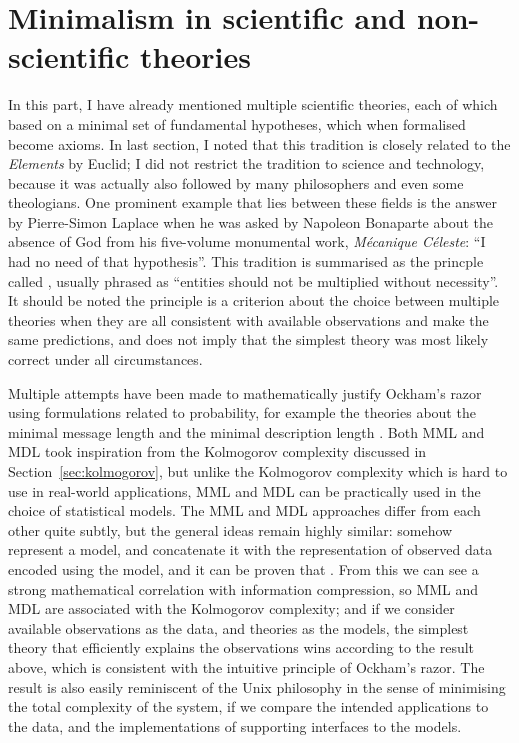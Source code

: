 \section{Minimalism in scientific and non-scientific theories}\label{sec:ockham}

In this part, I have already mentioned multiple scientific theories,
each of which based on a minimal set of fundamental hypotheses, which
when formalised become axioms.  In last section, I noted that this tradition
is closely related to the \emph{Elements} by Euclid; I did not restrict the
tradition to science and technology, because it was actually also followed
by many philosophers and even some theologians.  One prominent example that
lies between these fields is the answer by Pierre-Simon Laplace when he was
asked by Napoleon Bonaparte about the absence of God from his five-volume
monumental work, \emph{Mécanique Céleste}: ``I had no need of that hypothesis''.
This tradition is summarised as the princple called %
, usually phrased as ``entities should not be multiplied
without necessity''.  It should be noted the principle is a criterion about the
choice between multiple theories when they are all consistent with available
observations and make the same predictions, and does not imply that
the simplest theory was most likely correct under all circumstances.

Multiple attempts have been made to mathematically justify Ockham's razor
using formulations related to probability, for example the theories about the
minimal message length and the minimal description length%
.  Both MML and MDL took inspiration from the Kolmogorov
complexity discussed in Section~\ref{sec:kolmogorov}, but unlike the Kolmogorov
complexity which is hard to use in real-world applications, MML and MDL can
be practically used in the choice of statistical models.  The MML and MDL
approaches differ from each other quite subtly, but the general ideas remain
highly similar: somehow represent a model, and concatenate it with the
representation of observed data encoded using the model, and it can be proven
that .  From this we can see a strong mathematical correlation with
information compression, so MML and MDL are associated with the Kolmogorov
complexity; and if we consider available observations as the data, and theories
as the models, the simplest theory that efficiently explains the observations
wins according to the result above, which is consistent with the intuitive
principle of Ockham's razor.  The result is also easily reminiscent of the
Unix philosophy in the sense of minimising the total complexity of the
system, if we compare the intended applications to the data, and
the implementations of supporting interfaces to the models.

